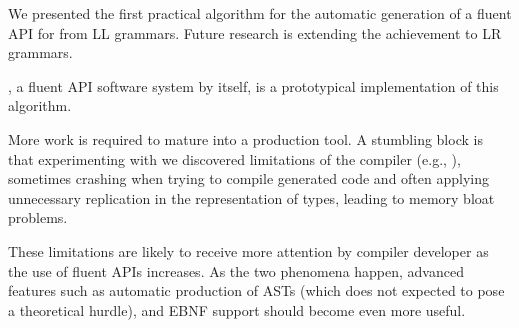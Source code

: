 We presented the first practical algorithm for the automatic generation of a
fluent API for \Java from LL grammars.  Future research is extending the
achievement to LR grammars. 

\Fajita, a fluent API software system by itself, is a prototypical
implementation of this algorithm. 

More work is required to mature \Fajita into a production tool. A stumbling
block is that experimenting with \Fajita we discovered limitations of the \Java
compiler (e.g., ), sometimes crashing when trying to compile
\Fajita generated code and often applying unnecessary replication in the
representation of types, leading to memory bloat problems.

These limitations are likely to receive more attention by compiler developer as
the use of fluent APIs increases. As the two phenomena happen, advanced
features such as automatic production of ASTs (which does not expected to pose 
a theoretical hurdle), and EBNF support should become even more useful.
